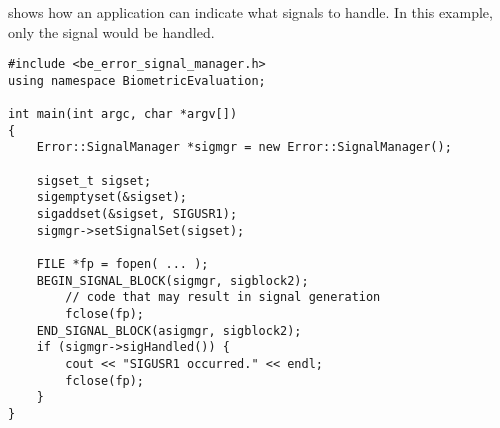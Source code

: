  shows how an application can indicate what
signals to handle. In this example, only the  signal would
be handled.

\begin{lstlisting}[caption={Specifying Signals to the \class{SignalManger}}, label=lst:signalmanageruse2]
#include <be_error_signal_manager.h>
using namespace BiometricEvaluation;

int main(int argc, char *argv[])
{
    Error::SignalManager *sigmgr = new Error::SignalManager();

    sigset_t sigset;
    sigemptyset(&sigset);
    sigaddset(&sigset, SIGUSR1);
    sigmgr->setSignalSet(sigset);

    FILE *fp = fopen( ... );
    BEGIN_SIGNAL_BLOCK(sigmgr, sigblock2);
        // code that may result in signal generation
        fclose(fp);
    END_SIGNAL_BLOCK(asigmgr, sigblock2);
    if (sigmgr->sigHandled()) {
        cout << "SIGUSR1 occurred." << endl;
        fclose(fp);
    }
}
\end{lstlisting}

